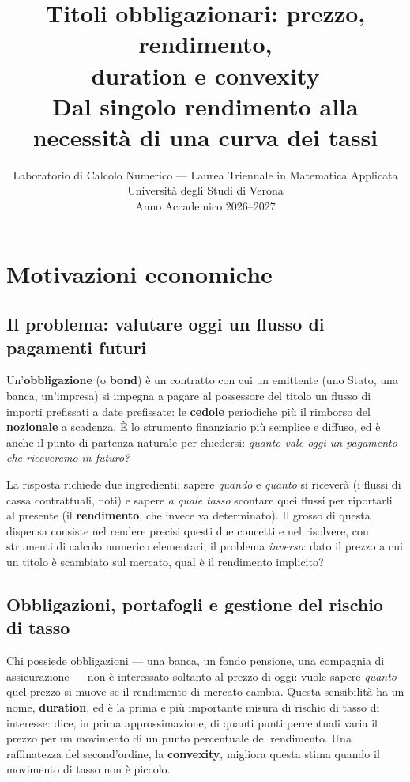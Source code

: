 \documentclass[11pt,a4paper]{article}
\title{%
  \textbf{Titoli obbligazionari: prezzo, rendimento,\\ duration e convexity}\\[6pt]
  \large Dal singolo rendimento alla necessità di una curva dei tassi\\[4pt]
}
\author{Laboratorio di Calcolo Numerico --- Laurea Triennale in Matematica Applicata\\
  Universit\`a degli Studi di Verona\\[2pt]
  Anno Accademico 2026--2027}
\date{}
\theoremstyle{plain}
\theoremstyle{definition}
\theoremstyle{remark}
\begin{document}
\maketitle
\tableofcontents
\newpage

\section{Motivazioni economiche}

\subsection{Il problema: valutare oggi un flusso di pagamenti futuri}

Un'\textbf{obbligazione} (o \textbf{bond}) è un contratto con cui un emittente (uno Stato, una
banca, un'impresa) si impegna a pagare al possessore del titolo un flusso di importi prefissati
a date prefissate: le \textbf{cedole} periodiche più il rimborso del \textbf{nozionale} a
scadenza. È lo strumento finanziario più semplice e diffuso, ed è anche il punto di partenza
naturale per chiedersi: \emph{quanto vale oggi un pagamento che riceveremo in futuro?}

La risposta richiede due ingredienti: sapere \emph{quando} e \emph{quanto} si riceverà (i
flussi di cassa contrattuali, noti) e sapere \emph{a quale tasso} scontare quei flussi per
riportarli al presente (il \textbf{rendimento}, che invece va determinato). Il grosso di questa
dispensa consiste nel rendere precisi questi due concetti e nel risolvere, con strumenti di
calcolo numerico elementari, il problema \emph{inverso}: dato il prezzo a cui un titolo è
scambiato sul mercato, qual è il rendimento implicito?

\subsection{Obbligazioni, portafogli e gestione del rischio di tasso}

Chi possiede obbligazioni --- una banca, un fondo pensione, una compagnia di assicurazione ---
non è interessato soltanto al prezzo di oggi: vuole sapere \emph{quanto} quel prezzo si muove
se il rendimento di mercato cambia. Questa sensibilità ha un nome, \textbf{duration}, ed è la
prima e più importante misura di rischio di tasso di interesse: dice, in prima approssimazione,
di quanti punti percentuali varia il prezzo per un movimento di un punto percentuale del
rendimento. Una raffinatezza del second'ordine, la \textbf{convexity}, migliora questa stima
quando il movimento di tasso non è piccolo.
\end{document}
